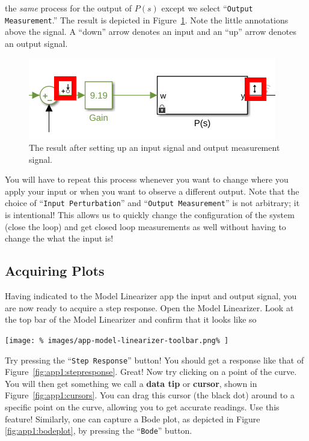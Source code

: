 the \emph{same} process for the output
of \(P(s)\) except we select ``\texttt{Output Measurement}.'' The result is
depicted in Figure~\ref{fig:app1:io-signals}. Note the little annotations
above the signal. A ``down'' arrow denotes an input and an ``up'' arrow denotes
an output signal.
%
\begin{figure}
  \centering
  \includegraphics[width=0.8\linewidth]{images/app-model-linearizer-io-3.png}
  \caption{%
    The result after setting up an input signal and output
    measurement signal.%
  }
  \label{fig:app1:io-signals}
\end{figure}
%
You will have to repeat this process whenever you want to change where you
apply your input or when you want to observe a different output. Note that
the choice of ``\texttt{Input Perturbation}'' and
``\texttt{Output Measurement}'' is not arbitrary; it is intentional! This
allows us to quickly change the configuration of the system (close the loop)
and get closed loop measurements as well without having to change the
what the input is!

\FloatBarrier
\subsection{Acquiring Plots}
Having indicated to the Model Linearizer app the input and output signal, you
are now ready to acquire a step response. Open the Model Linearizer. Look at
the top bar of the Model Linearizer and confirm that it looks like so
%
\begin{center}
  \texttt{[image: \%
    images/app-model-linearizer-toolbar.png\%
  ]}
\end{center}
%
Try pressing the ``\texttt{Step Response}'' button! You should get a response
like that of Figure~\ref{fig:app1:stepresponse}. Great! Now try clicking
on a point of the curve. You will then get something we call a \textbf{data
tip} or \textbf{cursor}, shown in Figure~\ref{fig:app1:cursors}.
You can drag this cursor (the black dot) around to a specific point on the
curve, allowing you to get accurate readings. Use this feature!
%
Similarly, one can capture a Bode plot, as depicted in Figure
\ref{fig:app1:bodeplot}, by pressing the ``\texttt{Bode}'' button.

